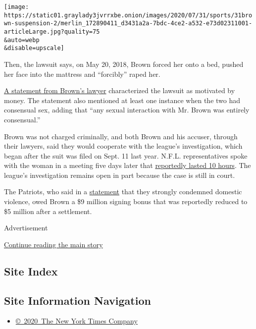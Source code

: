 \texttt{[image: https://static01.graylady3jvrrxbe.onion/images/2020/07/31/sports/31brown-suspension-2/merlin\_172890411\_d3431a2a-7bdc-4ce2-a532-e73d02311001-articleLarge.jpg?quality=75\\\&auto=webp\\\&disable=upscale]}

Then, the lawsuit says, on May 20, 2018, Brown forced her onto a bed,
pushed her face into the mattress and ``forcibly'' raped her.

\href{https://twitter.com/DarrenHeitner/status/1171584983280095233?s=20}{A
statement from Brown's lawyer} characterized the lawsuit as motivated by
money. The statement also mentioned at least one instance when the two
had consensual sex, adding that ``any sexual interaction with Mr. Brown
was entirely consensual.''

Brown was not charged criminally, and both Brown and his accuser,
through their lawyers, said they would cooperate with the league's
investigation, which began after the suit was filed on Sept. 11 last
year. N.F.L. representatives spoke with the woman in a meeting five days
later that
\href{https://sports.yahoo.com/the-nfl-has-interviewed-antonio-browns-accuser-now-roger-goodell-has-a-decision-to-make-014530565.html}{reportedly
lasted 10 hours}. The league's investigation remains open in part
because the case is still in court.

The Patriots, who said in a
\href{https://twitter.com/nick_underhill/status/1171631870607613957}{statement}
that they strongly condemned domestic violence, owed Brown a \$9 million
signing bonus that was reportedly reduced to \$5 million after a
settlement.

Advertisement

\protect\hyperlink{after-bottom}{Continue reading the main story}

\hypertarget{site-index}{%
\subsection{Site Index}\label{site-index}}

\hypertarget{site-information-navigation}{%
\subsection{Site Information
Navigation}\label{site-information-navigation}}

\begin{itemize}
\tightlist
\item
  \href{https://help.nytimes3xbfgragh.onion/hc/en-us/articles/115014792127-Copyright-notice}{©~2020~The
  New York Times Company}
\end{itemize}

